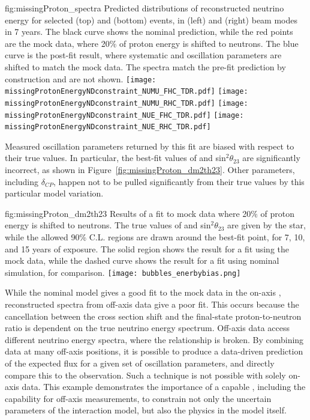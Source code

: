 \begin{dunefigure}{fig:missingProton_spectra}
{Predicted distributions of reconstructed neutrino energy for selected \numu (top) and \nue (bottom) events, in  (left) and  (right) beam modes in 7 years. The black curve shows the nominal  prediction, while the red points are the mock data, where 20\% of proton energy is shifted to neutrons. The blue curve is the post-fit result, where systematic and oscillation parameters are shifted to match the mock data. The  spectra match the pre-fit prediction by construction and are not shown.}
  \texttt{[image: missingProtonEnergyNDconstraint\_NUMU\_FHC\_TDR.pdf]}
  \texttt{[image: missingProtonEnergyNDconstraint\_NUMU\_RHC\_TDR.pdf]}
  \texttt{[image: missingProtonEnergyNDconstraint\_NUE\_FHC\_TDR.pdf]}
  \texttt{[image: missingProtonEnergyNDconstraint\_NUE\_RHC\_TDR.pdf]}
\end{dunefigure}

Measured oscillation parameters returned by this fit are biased with respect to their true values. In particular, the best-fit values of  and sin$^{2}\theta_{23}$ are significantly incorrect, as shown in Figure~\ref{fig:missingProton_dm2th23}. Other parameters, including $\delta_{CP}$, happen not to be pulled significantly from their true values by this particular model variation.

\begin{dunefigure}{fig:missingProton_dm2th23}
{Results of a fit to mock data where 20\% of proton energy is shifted to neutrons. The true values of  and sin$^{2}\theta_{23}$ are given by the star, while the allowed 90\% C.L. regions are drawn around the best-fit point, for 7, 10, and 15 years of exposure. The solid region shows the result for a fit using the mock data, while the dashed curve shows the result for a fit using nominal simulation, for comparison.}
  \texttt{[image: bubbles\_enerbybias.png]}
\end{dunefigure}

While the nominal model gives a good fit to the mock data in the on-axis , reconstructed spectra from off-axis  data give a poor fit. This occurs because the cancellation between the cross section shift and the final-state proton-to-neutron ratio is dependent on the true neutrino energy spectrum. Off-axis data access different neutrino energy spectra, where the relationship is broken. By combining data at many off-axis positions, it is possible to produce a data-driven prediction of the expected  flux for a given set of oscillation parameters, and directly compare this to the observation. Such a technique is not possible with solely on-axis  data. This example demonstrates the importance of a capable , including the capability for off-axis measurements, to constrain not only the uncertain parameters of the interaction model, but also the physics in the model itself.




